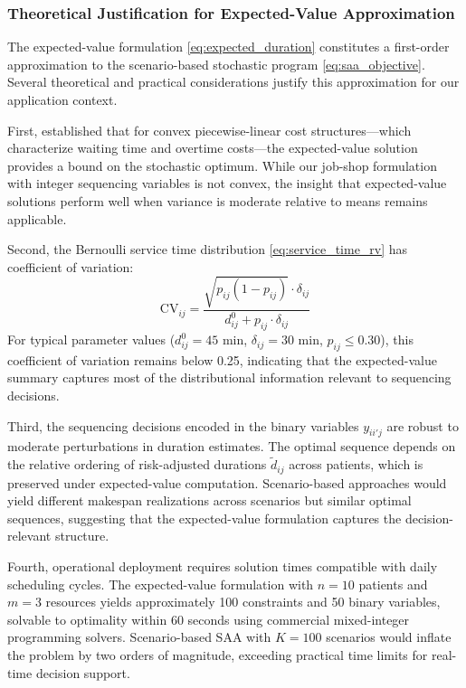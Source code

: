 \documentclass[11pt,a4paper]{article}
\begin{document}
\subsubsection{Theoretical Justification for Expected-Value Approximation}

The expected-value formulation \eqref{eq:expected_duration} constitutes a first-order approximation to the scenario-based stochastic program \eqref{eq:saa_objective}. Several theoretical and practical considerations justify this approximation for our application context.

First, \citet{denton2003sequential} established that for convex piecewise-linear cost structures---which characterize waiting time and overtime costs---the expected-value solution provides a bound on the stochastic optimum. While our job-shop formulation with integer sequencing variables is not convex, the insight that expected-value solutions perform well when variance is moderate relative to means remains applicable.

Second, the Bernoulli service time distribution \eqref{eq:service_time_rv} has coefficient of variation:
\begin{equation}
\text{CV}_{ij} = \frac{\sqrt{p_{ij}(1-p_{ij})} \cdot \delta_{ij}}{d_{ij}^0 + p_{ij} \cdot \delta_{ij}}
\end{equation}
For typical parameter values ($d_{ij}^0 = 45$ min, $\delta_{ij} = 30$ min, $p_{ij} \leq 0.30$), this coefficient of variation remains below 0.25, indicating that the expected-value summary captures most of the distributional information relevant to sequencing decisions.

Third, the sequencing decisions encoded in the binary variables $y_{ii'j}$ are robust to moderate perturbations in duration estimates. The optimal sequence depends on the relative ordering of risk-adjusted durations $\tilde{d}_{ij}$ across patients, which is preserved under expected-value computation. Scenario-based approaches would yield different makespan realizations across scenarios but similar optimal sequences, suggesting that the expected-value formulation captures the decision-relevant structure.

Fourth, operational deployment requires solution times compatible with daily scheduling cycles. The expected-value formulation with $n = 10$ patients and $m = 3$ resources yields approximately 100 constraints and 50 binary variables, solvable to optimality within 60 seconds using commercial mixed-integer programming solvers. Scenario-based SAA with $K = 100$ scenarios would inflate the problem by two orders of magnitude, exceeding practical time limits for real-time decision support.
\end{document}
